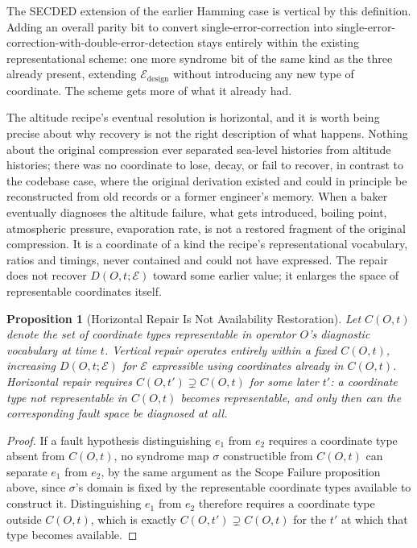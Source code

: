 \documentclass[11pt]{article}
\newtheorem{proposition}{Proposition}[section]
\begin{document}
The SECDED extension of the earlier Hamming case is vertical by this definition. Adding an overall parity bit to convert single-error-correction into single-error-correction-with-double-error-detection stays entirely within the existing representational scheme: one more syndrome bit of the same kind as the three already present, extending $\mathcal{E}_{\text{design}}$ without introducing any new type of coordinate. The scheme gets more of what it already had.

The altitude recipe's eventual resolution is horizontal, and it is worth being precise about why recovery is not the right description of what happens. Nothing about the original compression ever separated sea-level histories from altitude histories; there was no coordinate to lose, decay, or fail to recover, in contrast to the codebase case, where the original derivation existed and could in principle be reconstructed from old records or a former engineer's memory. When a baker eventually diagnoses the altitude failure, what gets introduced, boiling point, atmospheric pressure, evaporation rate, is not a restored fragment of the original compression. It is a coordinate of a kind the recipe's representational vocabulary, ratios and timings, never contained and could not have expressed. The repair does not recover $D(O,t;\mathcal{E})$ toward some earlier value; it enlarges the space of representable coordinates itself.

\begin{proposition}[Horizontal Repair Is Not Availability Restoration]
Let $C(O,t)$ denote the set of coordinate types representable in operator $O$'s diagnostic vocabulary at time $t$. Vertical repair operates entirely within a fixed $C(O,t)$, increasing $D(O,t;\mathcal{E})$ for $\mathcal{E}$ expressible using coordinates already in $C(O,t)$. Horizontal repair requires $C(O,t') \supsetneq C(O,t)$ for some later $t'$: a coordinate type not representable in $C(O,t)$ becomes representable, and only then can the corresponding fault space be diagnosed at all.
\end{proposition}

\begin{proof}
If a fault hypothesis distinguishing $e_1$ from $e_2$ requires a coordinate type absent from $C(O,t)$, no syndrome map $\sigma$ constructible from $C(O,t)$ can separate $e_1$ from $e_2$, by the same argument as the Scope Failure proposition above, since $\sigma$'s domain is fixed by the representable coordinate types available to construct it. Distinguishing $e_1$ from $e_2$ therefore requires a coordinate type outside $C(O,t)$, which is exactly $C(O,t') \supsetneq C(O,t)$ for the $t'$ at which that type becomes available.
\end{proof}
\end{document}
